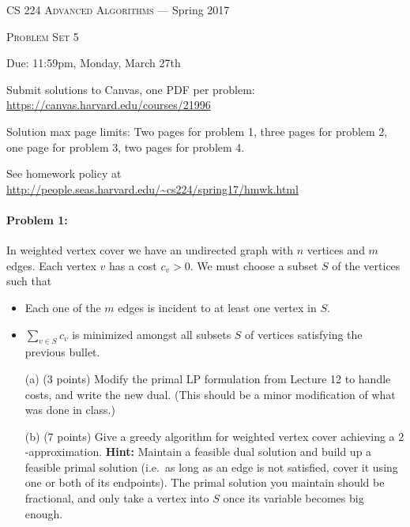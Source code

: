 \documentclass[12pt]{article}
\begin{document}
\thispagestyle{empty}

\begin{center}
{\Large \textsc{CS 224 Advanced Algorithms} --- Spring 2017}

\bigskip

{\Large \textsc{Problem Set 5}}

\smallskip

Due: 11:59pm, Monday, March 27th

\medskip

Submit solutions to Canvas, one PDF per problem: \url{https://canvas.harvard.edu/courses/21996}

\medskip

Solution max page limits: Two pages for problem 1, three pages for problem 2, one page for problem 3, two pages for problem 4.

\bigskip

{\footnotesize See homework policy at \url{http://people.seas.harvard.edu/~cs224/spring17/hmwk.html}}
\end{center}

\paragraph{Problem 1:} In weighted vertex cover we have an undirected graph with $n$ vertices and $m$ edges. Each vertex $v$ has a cost $c_v > 0$. We must choose a subset $S$ of the vertices such that
\begin{itemize}
\item Each one of the $m$ edges is incident to at least one vertex in $S$.
\item $\sum_{v \in S} c_v$ is minimized amongst all subsets $S$ of vertices satisfying the previous bullet.
\end{itemize}

\begin{itemize}
\item[(a)] (3 points) Modify the primal LP formulation from Lecture 12 to handle costs, and write the new dual. (This should be a minor modification of what was done in class.)
\item[(b)] (7 points) Give a greedy algorithm for weighted vertex cover achieving a $2$-approximation. \textbf{Hint:} Maintain a feasible dual solution and build up a feasible primal solution (i.e.\ as long as an edge is not satisfied, cover it using one or both of its endpoints). The primal solution you maintain should be fractional, and only take a vertex into $S$ once its variable becomes big enough.
\end{itemize}
\end{document}
